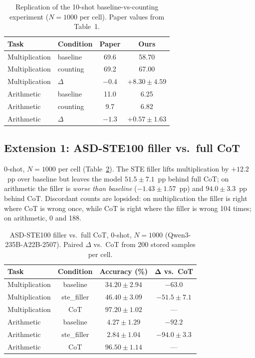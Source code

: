 \documentclass[11pt,a4paper]{article}
\begin{document}
\begin{table}[h]
\centering
\caption{Replication of the 10-shot baseline-vs-counting experiment
($N{=}1000$ per cell). Paper values from \citet{baherwani2026not} Table~1.}
\label{tab:replication}
\begin{tabular}{llcc}
\toprule
\textbf{Task} & \textbf{Condition} & \textbf{Paper} & \textbf{Ours} \\
\midrule
Multiplication & baseline & 69.6 & 58.70 \\
Multiplication & counting & 69.2 & 67.00 \\
Multiplication & $\Delta$ & $-0.4$ & $\mathbf{+8.30 \pm 4.59}$ \\
\midrule
Arithmetic & baseline & 11.0 & 6.25 \\
Arithmetic & counting & 9.7 & 6.82 \\
Arithmetic & $\Delta$ & $-1.3$ & $+0.57 \pm 1.63$ \\
\bottomrule
\end{tabular}
\end{table}

\subsection{Extension 1: ASD-STE100 filler vs.\ full CoT}
\label{sec:stecot}

0-shot, $N{=}1000$ per cell (Table~\ref{tab:stecot}). The STE filler lifts
multiplication by $+12.2$~pp over baseline but leaves the model $51.5 \pm
7.1$~pp behind full CoT; on arithmetic the filler is \emph{worse than baseline}
($-1.43 \pm 1.57$~pp) and $94.0 \pm 3.3$~pp behind CoT. Discordant counts are
lopsided: on multiplication the filler is right where CoT is wrong once,
while CoT is right where the filler is wrong 104 times; on arithmetic, 0 and
188.

\begin{table}[h]
\centering
\caption{ASD-STE100 filler vs.\ full CoT, 0-shot, $N{=}1000$
(Qwen3-235B-A22B-2507). Paired $\Delta$ vs.\ CoT from 200 stored samples
per cell.}
\label{tab:stecot}
\begin{tabular}{lccc}
\toprule
\textbf{Task} & \textbf{Condition} & \textbf{Accuracy (\%)} & $\mathbf{\Delta}$ \textbf{vs.\ CoT} \\
\midrule
Multiplication & baseline & $34.20 \pm 2.94$ & $-63.0$ \\
Multiplication & ste\_filler & $46.40 \pm 3.09$ & $\mathbf{-51.5 \pm 7.1}$ \\
Multiplication & CoT & $97.20 \pm 1.02$ & --- \\
\midrule
Arithmetic & baseline & $4.27 \pm 1.29$ & $-92.2$ \\
Arithmetic & ste\_filler & $2.84 \pm 1.04$ & $\mathbf{-94.0 \pm 3.3}$ \\
Arithmetic & CoT & $96.50 \pm 1.14$ & --- \\
\bottomrule
\end{tabular}
\end{table}
\end{document}

